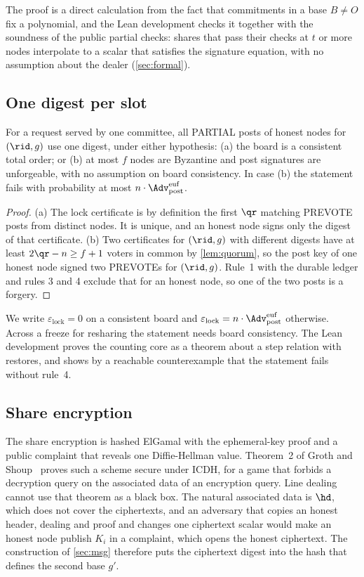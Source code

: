 The proof is a direct calculation from the fact that commitments in a base $B \neq O$ fix a polynomial, and the Lean development checks it together with the soundness of the public partial checks: shares that pass their checks at $t$ or more nodes interpolate to a scalar that satisfies the signature equation, with no assumption about the dealer (\cref{sec:formal}).

\subsection{One digest per slot}

\begin{lemma}\label{lem:digest}
For a request served by one committee, all PARTIAL posts of honest nodes for $(\rid, g)$ use one digest, under either hypothesis: \textup{(a)} the board is a consistent total order; or \textup{(b)} at most $f$ nodes are Byzantine and post signatures are unforgeable, with no assumption on board consistency. In case \textup{(b)} the statement fails with probability at most $n \cdot \Adv^{\mathrm{euf}}_{\mathrm{post}}$.
\end{lemma}

\begin{proof}
(a) The lock certificate is by definition the first $\qr$ matching PREVOTE posts from distinct nodes. It is unique, and an honest node signs only the digest of that certificate. (b) Two certificates for $(\rid, g)$ with different digests have at least $2\qr - n \ge f+1$ voters in common by \cref{lem:quorum}, so the post key of one honest node signed two PREVOTEs for $(\rid, g)$. Rule~1 with the durable ledger and rules 3 and 4 exclude that for an honest node, so one of the two posts is a forgery.
\end{proof}

We write $\varepsilon_{\mathrm{lock}} = 0$ on a consistent board and $\varepsilon_{\mathrm{lock}} = n \cdot \Adv^{\mathrm{euf}}_{\mathrm{post}}$ otherwise. Across a freeze for resharing the statement needs board consistency. The Lean development proves the counting core as a theorem about a step relation with restores, and shows by a reachable counterexample that the statement fails without rule~4.

\subsection{Share encryption}

The share encryption is hashed ElGamal with the ephemeral-key proof and a public complaint that reveals one Diffie-Hellman value. Theorem~2 of Groth and Shoup~\cite[pp.~29--32]{GS22} proves such a scheme secure under ICDH, for a game that forbids a decryption query on the associated data of an encryption query. Line dealing cannot use that theorem as a black box. The natural associated data is $\hd$, which does not cover the ciphertexts, and an adversary that copies an honest header, dealing and proof and changes one ciphertext scalar would make an honest node publish $K_i$ in a complaint, which opens the honest ciphertext. The construction of \cref{sec:msg} therefore puts the ciphertext digest into the hash that defines the second base $g'$.

